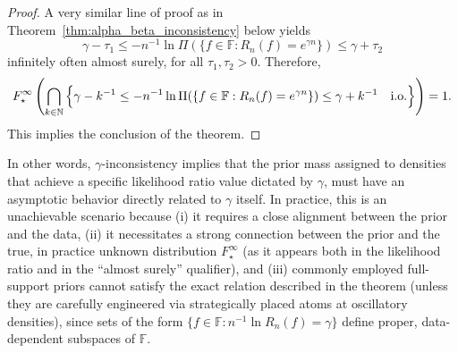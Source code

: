 \documentclass[11pt,twoside]{article}
\def\NN{\mathbb{N}}
\def\FF{\mathbb{F}}
\def\FF{\mathbb{F}}
\begin{document}
\begin{proof}
    A very similar line of proof as in Theorem~\ref{thm:alpha_beta_inconsistency} below yields
    \begin{equation*}
        \gamma - \tau_1 \leq -n^{-1}\ln\Pi(\{f\in\mathbb F : R_n(f) = e^{\gamma n}\}) \leq \gamma + \tau_2
    \end{equation*}
    infinitely often almost surely, for all $\tau_1, \tau_2>0$. Therefore,
    \begin{equation*}
        F_\star^\infty\left(\bigcap_{k\in\NN}\Big\{\gamma - k^{-1} \leq -n^{-1}\ln\Pi(\{f\in\mathbb F : R_n(f) = e^{\gamma n}\}) \leq \gamma + k^{-1} \quad \textnormal{i.o.}\Big\}\right) = 1.
    \end{equation*}
    This implies the conclusion of the theorem.
\end{proof}

In other words, $\gamma$-inconsistency implies that the prior mass assigned to densities that achieve a specific likelihood ratio value dictated by $\gamma$, must have an asymptotic behavior directly related to $\gamma$ itself. In practice, this is an unachievable scenario because (i) it requires a close alignment between the prior and the data, (ii) it necessitates a strong connection between the prior and the true, in practice unknown distribution $F_\star^\infty$ (as it appears both in the likelihood ratio and in the ``almost surely'' qualifier), and (iii) commonly employed full-support priors cannot satisfy the exact relation described in the theorem (unless they are carefully engineered via strategically placed atoms at oscillatory densities), since sets of the form $\{f \in \FF : n^{-1} \ln R_n(f) = \gamma\}$ define proper, data-dependent subspaces of $\FF$.
\end{document}
